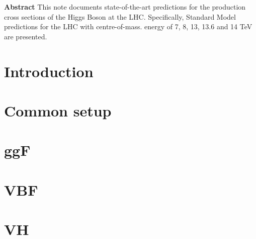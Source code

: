 \documentclass[11pt]{article}
\begin{document}
\begin{titlepage}
\begin{center}
           
           
           \textbf{}
  \end{center}
  
  \thispagestyle{empty}
  
  
  
  
  \mbox{}\vspace*{3em}
  \begin{center}
    \textbf{Abstract}
    This note documents state-of-the-art predictions for the production cross sections of the Higgs Boson at the LHC. 
    Specifically, Standard Model predictions for the LHC with centre-of-mass. energy of 7, 8, 13, 13.6 and 14 TeV are presented.
  \end{center}
\end{titlepage}
\newpage
\tableofcontents

\section{Introduction}
\label{sec:intro}


\section{Common setup}
\label{sec:setup}


\section{ggF}
\label{sec:ggF}


\section{VBF}
\label{sec:VBF}


\section{VH}
\label{sec:VH}

\end{document}
